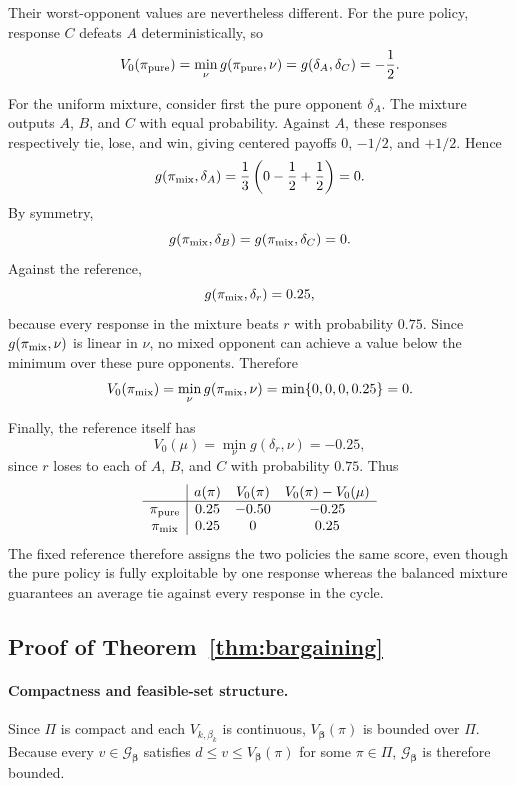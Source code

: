 \documentclass{article}
\theoremstyle{remark}
\theoremstyle{plain}
\newcommand{\G}{\mathcal{G}}
\begin{document}
Their worst-opponent values are nevertheless different. For the pure
policy, response $C$ defeats $A$ deterministically, so
\[
V_0(\pi_{\rm pure})
=
\min_{\nu} g(\pi_{\rm pure},\nu)
=
g(\delta_A,\delta_C)
=
-\frac12.
\]

For the uniform mixture, consider first the pure opponent $\delta_A$.
The mixture outputs $A$, $B$, and $C$ with equal probability. Against
$A$, these responses respectively tie, lose, and win, giving centered
payoffs $0$, $-1/2$, and $+1/2$. Hence
\[
g(\pi_{\rm mix},\delta_A)
=
\frac13
\left(
0-\frac12+\frac12
\right)
=
0.
\]
By symmetry,
\[
g(\pi_{\rm mix},\delta_B)
=
g(\pi_{\rm mix},\delta_C)
=
0.
\]
Against the reference,
\[
g(\pi_{\rm mix},\delta_r)=0.25,
\]
because every response in the mixture beats $r$ with probability $0.75$.
Since $g(\pi_{\rm mix},\nu)$ is linear in $\nu$, no mixed opponent can
achieve a value below the minimum over these pure opponents. Therefore
\[
V_0(\pi_{\rm mix})
=
\min_{\nu}g(\pi_{\rm mix},\nu)
=
\min\{0,0,0,0.25\}
=
0.
\]

Finally, the reference itself has
\[
V_0(\mu)
=
\min_{\nu}g(\delta_r,\nu)
=
-0.25,
\]
since $r$ loses to each of $A$, $B$, and $C$ with probability $0.75$.
Thus
\[
\begin{array}{c|ccc}
& a(\pi) & V_0(\pi) & V_0(\pi)-V_0(\mu)\\
\hline
\pi_{\rm pure} & 0.25 & -0.50 & -0.25\\
\pi_{\rm mix}  & 0.25 & 0     &  0.25
\end{array}
\]
The fixed reference therefore assigns the two policies the same score,
even though the pure policy is fully exploitable by one response whereas
the balanced mixture guarantees an average tie against every response
in the cycle.

\subsection{Proof of Theorem~\ref{thm:bargaining}}
\label{app:bargaining-proof}

\paragraph{Compactness and feasible-set structure.}
Since $\Pi$ is compact and each $V_{k,\beta_k}$ is continuous,
$V_{\boldsymbol\beta}(\pi)$ is bounded over $\Pi$. Because every
$v\in\G_{\boldsymbol\beta}$ satisfies
$d\le v\le V_{\boldsymbol\beta}(\pi)$ for some $\pi\in\Pi$,
$\G_{\boldsymbol\beta}$ is therefore bounded.
\end{document}
